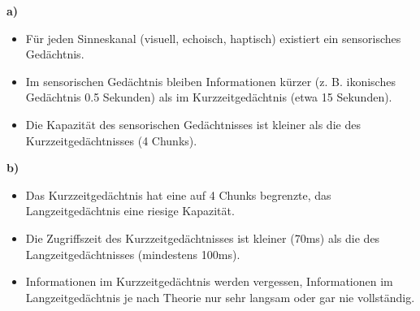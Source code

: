 
\textbf{a)}
\begin{itemize}
  \item Für jeden Sinneskanal (visuell, echoisch, haptisch) existiert ein sensorisches Gedächtnis.
  \item Im sensorischen Gedächtnis bleiben Informationen kürzer (z. B. ikonisches Gedächtnis 0.5 Sekunden) als im Kurzzeitgedächtnis (etwa 15 Sekunden).
  \item Die Kapazität des sensorischen Gedächtnisses ist kleiner als die des Kurzzeitgedächtnisses (4 Chunks).
\end{itemize}
\textbf{b)}
\begin{itemize}
  \item Das Kurzzeitgedächtnis hat eine auf 4 Chunks begrenzte, das Langzeitgedächtnis eine riesige Kapazität.
  \item Die Zugriffszeit des Kurzzeitgedächtnisses ist kleiner (70ms) als die des Langzeitgedächtnisses (mindestens 100ms).
  \item Informationen im Kurzzeitgedächtnis werden vergessen, Informationen im Langzeitgedächtnis je nach Theorie nur sehr langsam oder gar nie vollständig.
\end{itemize}